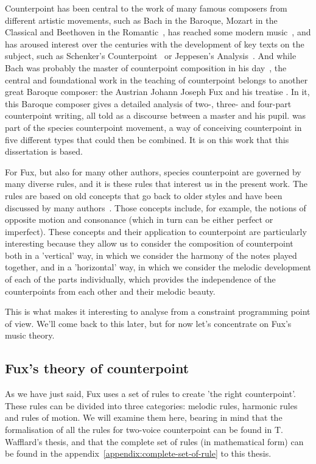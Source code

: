 Counterpoint has been central to the work of many famous composers from different artistic movements, such as Bach in the Baroque, Mozart in the Classical and Beethoven in the Romantic~\cite{kramer1987gradus}, has reached some modern music~\cite{altozano2017contrapunto}, and has aroused interest over the centuries with the development of key texts on the subject, such as Schenker's Counterpoint~\cite{schenker1906} or Jeppesen's Analysis~\cite{jeppesen1960}. And while Bach was probably the master of counterpoint composition in his day~\cite{yearsley2002}, the central and foundational work in the teaching of counterpoint belongs to another great Baroque composer: the Austrian Johann Joseph Fux and his treatise \gap. In it, this Baroque composer gives a detailed analysis of two-, three- and four-part counterpoint writing, all told as a discourse between a master and his pupil. \gaps was part of the species counterpoint movement, a way of conceiving counterpoint in five different types that could then be combined. It is on this work that this dissertation is based.


For Fux, but also for many other authors, species counterpoint are governed by many diverse rules, and it is these rules that interest us in the present work. The rules are based on old concepts that go back to older styles and have been discussed by many authors~\cite{crocker1962}.  Those concepts include, for example, the notions of opposite motion and consonance (which in turn can be either perfect or imperfect). These concepts and their application to counterpoint are particularly interesting because they allow us to consider the composition of counterpoint both in a 'vertical' way, in which we consider the harmony of the notes played together, and in a 'horizontal' way, in which we consider the melodic development of each of the parts individually, which provides the independence of the counterpoints from each other and their melodic beauty.

This is what makes it interesting to analyse from a constraint programming point of view. We'll come back to this later, but for now let's concentrate on Fux's music theory.

\subsection{Fux's theory of counterpoint}
As we have just said, Fux uses a set of rules to create 'the right counterpoint'. These rules can be divided into three categories: melodic rules, harmonic rules and rules of motion. We will examine them here, bearing in mind that the formalisation of all the rules for two-voice counterpoint can be found in T. Wafflard's thesis, and that the complete set of rules (in mathematical form) can be found in the appendix~\ref{appendix:complete-set-of-rule} to this thesis.

